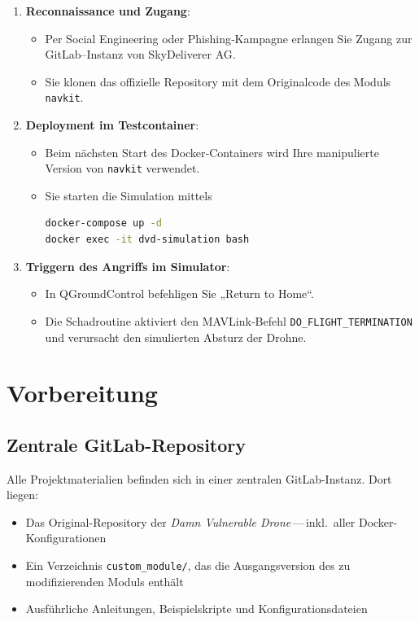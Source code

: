 \documentclass[a4paper,12pt]{report}
\begin{document}
\begin{enumerate}
  \item \textbf{Reconnaissance und Zugang}:  
    \begin{itemize}
      \item Per Social Engineering oder Phishing‐Kampagne erlangen Sie Zugang zur GitLab–Instanz von SkyDeliverer AG.
      \item Sie klonen das offizielle Repository mit dem Originalcode des Moduls \texttt{navkit}.
    \end{itemize}

  \item \textbf{Deployment im Testcontainer}:  
    \begin{itemize}
      \item Beim nächsten Start des Docker‐Containers wird Ihre manipulierte Version von \texttt{navkit} verwendet.
      \item Sie starten die Simulation mittels
      \begin{lstlisting}[language=bash]
docker-compose up -d
docker exec -it dvd-simulation bash
      \end{lstlisting}
    \end{itemize}

  \item \textbf{Triggern des Angriffs im Simulator}:  
    \begin{itemize}
      \item In QGroundControl befehligen Sie „Return to Home“.  
      \item Die Schadroutine aktiviert den MAVLink‐Befehl \texttt{DO\_FLIGHT\_TERMINATION} und verursacht den simulierten Absturz der Drohne.
     \end{itemize}
\end{enumerate}
\chapter{Vorbereitung}
\section{Zentrale GitLab-Repository}
Alle Projektmaterialien befinden sich in einer zentralen GitLab-Instanz. Dort liegen:
\begin{itemize}
  \item Das Original-Repository der \emph{Damn Vulnerable Drone}\,—\,inkl.\ aller Docker-Konfigurationen
  \item Ein Verzeichnis \texttt{custom\_module/}, das die Ausgangsversion des zu modifizierenden Moduls enthält
  \item Ausführliche Anleitungen, Beispielskripte und Konfigurationsdateien
\end{itemize}
\end{document}
